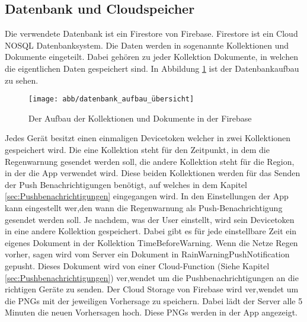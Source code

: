 \subsection{Datenbank und Cloudspeicher}\label{datenbank und cloudspeicher}
Die verwendete Datenbank ist ein Firestore von Firebase. Firestore ist ein Cloud NOSQL Datenbanksystem. 
Die Daten werden in sogenannte Kollektionen und Dokumente eingeteilt. 
Dabei gehören zu jeder Kollektion Dokumente, in welchen die eigentlichen Daten gespeichert sind. 
In Abbildung \ref{fig:datenbank_aufbau} ist der Datenbankaufbau zu sehen.
\begin{figure}[h]
 \centering
 \texttt{[image: abb/datenbank\_aufbau\_übersicht]}
 \caption[Datenbankarchitektur]{Der Aufbau der Kollektionen und Dokumente in der Firebase}
\label{fig:datenbank_aufbau}
\end{figure}

Jedes Gerät besitzt einen einmaligen Devicetoken welcher in zwei Kollektionen gespeichert wird. 
Die eine Kollektion steht für den Zeitpunkt, in dem die Regenwarnung gesendet werden soll, die andere Kollektion steht für die Region, in der die App verwendet wird. 
Diese beiden Kollektionen werden für das Senden der Push Benachrichtigungen benötigt, auf welches in dem Kapitel \ref{sec:Pushbenachrichtigungen} eingegangen wird. 
In den Einstellungen der App kann eingestellt wer,den wann die Regenwarnung als Push-Benachrichtigung gesendet werden soll.
Je nachdem, was der User einstellt, wird sein Devicetoken in eine andere Kollektion gespeichert. 
Dabei gibt es für jede einstellbare Zeit ein eigenes Dokument in der Kollektion TimeBeforeWarning. 
Wenn die Netze Regen vorher, sagen wird vom Server ein Dokument in RainWarningPushNotification gepusht. 
Dieses Dokument wird von einer Cloud-Function (Siehe Kapitel \ref{sec:Pushbenachrichtigungen}) ver,wendet um die Pushbenachrichtigungen an die richtigen Geräte zu senden.
Der Cloud Storage von Firebase wird ver,wendet um die PNGs mit der jeweiligen Vorhersage zu speichern.
Dabei lädt der Server alle 5 Minuten die neuen Vorhersagen hoch. Diese PNGs werden in der App angezeigt.